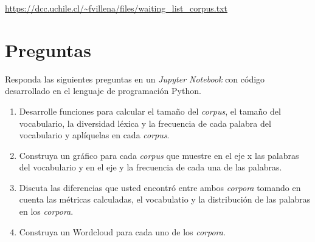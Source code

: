 \documentclass{article}
\begin{document}
\begin{center}
	\url{https://dcc.uchile.cl/~fvillena/files/waiting_list_corpus.txt}
\end{center}

\section*{Preguntas}

Responda las siguientes preguntas en un \textit{Jupyter Notebook} con código desarrollado en el lenguaje de programación Python.

\begin{enumerate}
	\item Desarrolle funciones para calcular el tamaño del \textit{corpus}, el tamaño del vocabulario, la diversidad léxica y la frecuencia de cada palabra del vocabulario y aplíquelas en cada \textit{corpus}.
	\item Construya un gráfico para cada \textit{corpus} que muestre en el eje x las palabras del vocabulario y en el eje y la frecuencia de cada una de las palabras.
	\item Discuta las diferencias que usted encontró entre ambos \textit{corpora} tomando en cuenta las métricas calculadas, el vocabulatio y la distribución de las palabras en los \textit{corpora}.
	\item Construya un Wordcloud para cada uno de los \textit{corpora}.
\end{enumerate}
\end{document}
